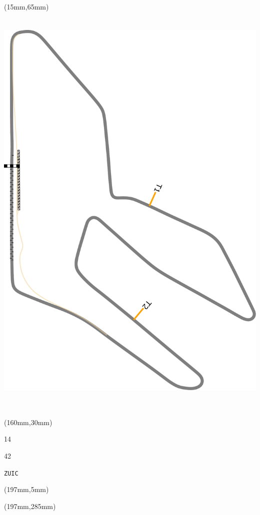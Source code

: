 \begin{textblock*}{185mm}(15mm,65mm)%
\centering
\mbox{\includegraphics[width=185mm,height=210mm,keepaspectratio]{PT/ZUIC.pdf}}
\end{textblock*}
\begin{textblock*}{40mm}(160mm,30mm)%
\Large
\par{} 
\par14 
\par42 
\par\hfill\tiny\tt ZUIC\\
\end{textblock*}
\begin{textblock*}{20mm}(197mm,5mm)%
\fbox{\thepage}
\label{ZUIC}
\end{textblock*}
\begin{textblock*}{20mm}(197mm,285mm)%
\fbox{\thepage}
\end{textblock*}

\null\newpage

